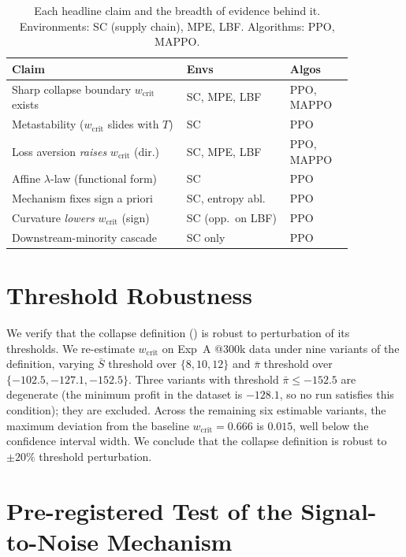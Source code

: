 \documentclass[letterpaper]{article}
\theoremstyle{plain}
\newcommand{\wcrit}{w_{\mathrm{crit}}}
\begin{document}
\begin{table}[h]
\centering
\caption{Each headline claim and the breadth of evidence behind it.
Environments: SC (supply chain), MPE, LBF. Algorithms: PPO, MAPPO.}
\label{tab:claim_ledger}
\small
\begin{tabular}{p{0.44\linewidth}p{0.26\linewidth}p{0.16\linewidth}}
\toprule
Claim & Envs & Algos \\
\midrule
Sharp collapse boundary $\wcrit$ exists & SC, MPE, LBF & PPO, MAPPO \\
Metastability ($\wcrit$ slides with $T$) & SC & PPO \\
Loss aversion \emph{raises} $\wcrit$ (dir.) & SC, MPE, LBF & PPO, MAPPO \\
Affine $\lambda$-law (functional form) & SC & PPO \\
Mechanism fixes sign a priori & SC, entropy abl. & PPO \\
Curvature \emph{lowers} $\wcrit$ (sign) & SC (opp.\ on LBF) & PPO \\
Downstream-minority cascade & SC only & PPO \\
\bottomrule
\end{tabular}
\end{table}

\section{Threshold Robustness}
\label{sec:appendix_robustness}

We verify that the collapse definition () is robust to
perturbation of its thresholds.
We re-estimate $\wcrit$ on Exp~A @300k data under nine variants of the
definition, varying $\bar{S}$ threshold over $\{8, 10, 12\}$ and
$\bar{\pi}$ threshold over $\{-102.5, -127.1, -152.5\}$.
Three variants with threshold $\bar{\pi} \leq -152.5$ are degenerate
(the minimum profit in the dataset is $-128.1$, so no run satisfies
this condition); they are excluded.
Across the remaining six estimable variants, the maximum deviation from
the baseline $\wcrit = 0.666$ is $0.015$, well below the confidence
interval width.
We conclude that the collapse definition is robust to $\pm 20\%$ threshold
perturbation.

\section{Pre-registered Test of the Signal-to-Noise Mechanism}
\label{sec:appendix_snr}
\end{document}
